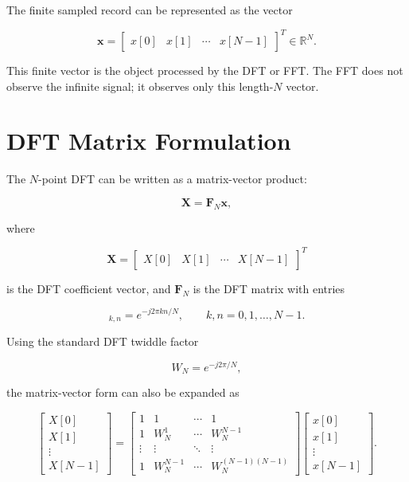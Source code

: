 ﻿\documentclass[11pt]{article}
\begin{document}
The finite sampled record can be represented as the vector

\begin{equation}
\bm{x}
=
\begin{bmatrix}
x[0] & x[1] & \cdots & x[N-1]
\end{bmatrix}^{T}
\in \mathbb{R}^{N}.
\end{equation}

This finite vector is the object processed by the DFT or FFT. The FFT does not observe the infinite signal; it observes only this length-$N$ vector.

\section{DFT Matrix Formulation}

The $N$-point DFT can be written as a matrix-vector product:

\begin{equation}
\bm{X} = \bm{F}_N \bm{x},
\end{equation}

where

\begin{equation}
\bm{X}
=
\begin{bmatrix}
X[0] & X[1] & \cdots & X[N-1]
\end{bmatrix}^{T}
\end{equation}

is the DFT coefficient vector, and $\bm{F}_N$ is the DFT matrix with entries

\begin{equation}
[\bm{F}_N]_{k,n}
=
e^{-j2\pi kn/N},
\qquad
k,n = 0,1,\ldots,N-1.
\end{equation}


Using the standard DFT twiddle factor

\begin{equation}
W_N = e^{-j2\pi/N},
\end{equation}

the matrix-vector form can also be expanded as

\begin{equation}
\begin{bmatrix}
X[0] \\
X[1] \\
\vdots \\
X[N-1]
\end{bmatrix}
=
\begin{bmatrix}
1 & 1 & \cdots & 1 \\
1 & W_N^1 & \cdots & W_N^{N-1} \\
\vdots & \vdots & \ddots & \vdots \\
1 & W_N^{N-1} & \cdots & W_N^{(N-1)(N-1)}
\end{bmatrix}
\begin{bmatrix}
x[0] \\
x[1] \\
\vdots \\
x[N-1]
\end{bmatrix}.
\end{equation}
\end{document}
